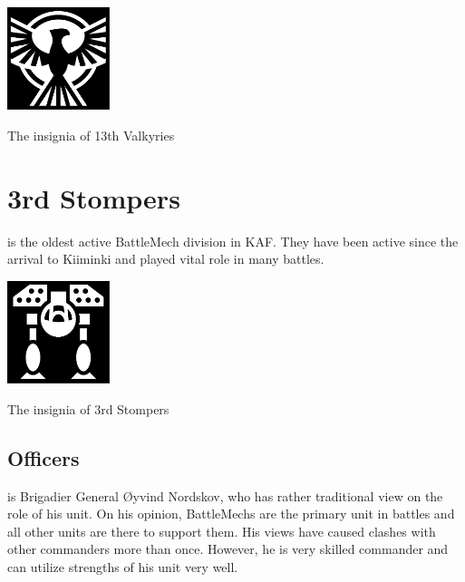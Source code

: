 \documentclass{tufte-book}
\begin{document}
\bigskip
{}

\begin{marginfigure}[0\baselineskip]
  \includegraphics[width=3cm]{condor-emblem}
  \caption{The insignia of 13th Valkyries}
  \label{fig:valkyries}
\end{marginfigure}


\section{3rd Stompers}

 is the oldest active BattleMech division in KAF.
They have been active since the arrival to Kiiminki and played vital role in
many battles.

\begin{marginfigure}[0\baselineskip]
  \includegraphics[width=3cm]{missile-mech}
  \caption{The insignia of 3rd Stompers}
  \label{fig:stompers}
\end{marginfigure}

\subsection{Officers}

 is Brigadier General \O yvind
Nordskov, who has rather traditional view on the role of his unit. On his
opinion, BattleMechs are the primary unit in battles and all other units are
there to support them. His views have caused clashes with other commanders
more than once. However, he is very skilled commander and can utilize
strengths of his unit very well.
\end{document}
